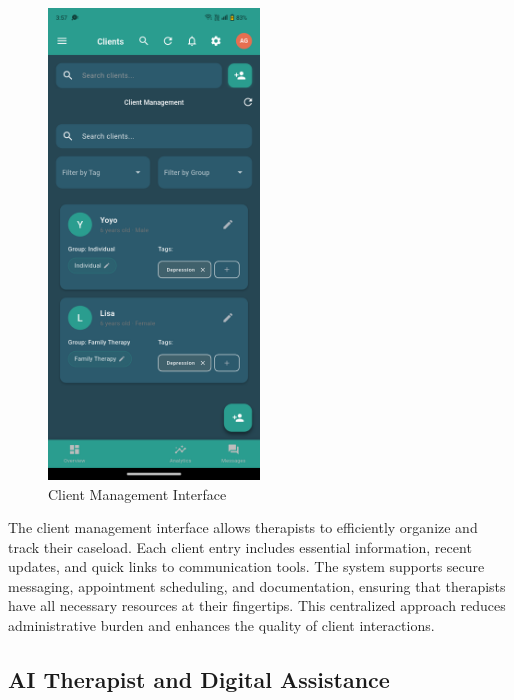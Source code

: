 \documentclass[12pt,a4paper]{article}
\newcommand{\sectiontitle}[1]{\subsection{#1}}
\begin{document}
\begin{figure}[H]
    \centering
    \includegraphics[width=0.5\textwidth]{Screenshots/clientmanagement.png}
    \caption{Client Management Interface}
    \label{fig:client-management}
\end{figure}
The client management interface allows therapists to efficiently organize and track their caseload. Each client entry includes essential information, recent updates, and quick links to communication tools. The system supports secure messaging, appointment scheduling, and documentation, ensuring that therapists have all necessary resources at their fingertips. This centralized approach reduces administrative burden and enhances the quality of client interactions.

\sectiontitle{AI Therapist and Digital Assistance}
\end{document}
